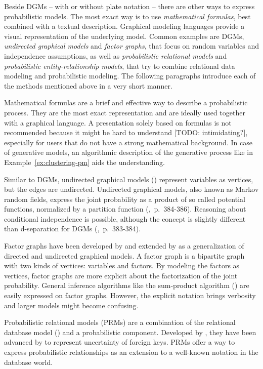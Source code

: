 Beside DGMs -- with or without plate notation -- there are other ways to express probabilistic models. The most exact way is to use \emph{mathematical formulas}, best combined with a textual description. Graphical modeling languages provide a visual representation of the underlying model. Common examples are DGMs, \emph{undirected graphical models} and \emph{factor graphs}, that focus on random variables and independence assumptions, as well as \emph{probabilistic relational models} and \emph{probabilistic entity-relationship models}, that try to combine relational data modeling and probabilistic modeling. The following paragraphs introduce each of the methods mentioned above in a very short manner.

Mathematical formulas are a brief and effective way to describe a probabilistic process. They are the most exact representation and are ideally used together with a graphical language. A presentation solely based on formulas is not recommended because it might be hard to understand [TODO: intimidating?], especially for users that do not have a strong mathematical background. In case of generative models, an algorithmic description of the generative process like in Example~\ref{ex:clustering-pm} aids the understanding. 

Similar to DGMs, undirected graphical models (\cite{kindermann1980markov}) represent variables as vertices, but the edges are undirected. Undirected graphical models, also known as Markov random fields, express the joint probability as a product of so called potential functions, normalized by a partition function (\cite{bishop2006pattern},~p.~384-386). Reasoning about conditional independence is possible, although the concept is slightly different than d-separation for DGMs (\cite{bishop2006pattern},~p.~383-384).

Factor graphs have been developed by \textcite{kschischang2001factor} and extended by \textcite{frey2002extending} as a generalization of directed and undirected graphical models. A factor graph is a bipartite graph with two kinds of vertices: variables and factors. By modeling the factors as vertices, factor graphs are more explicit about the factorization of the joint probability. General inference algorithms like the sum-product algorithm (\cite{pearl1988probabilistic}) are easily expressed on factor graphs. However, the explicit notation brings verbosity and larger models might become confusing.

Probabilistic relational models (PRMs) are a combination of the relational database model (\cite{codd1970relational}) and a probabilistic component. Developed by \textcite{friedman1999learning}, they have been advanced by \textcite{getoor2003learning} to represent uncertainty of foreign keys. PRMs offer a way to express probabilistic relationships as an extension to a well-known notation in the database world.

